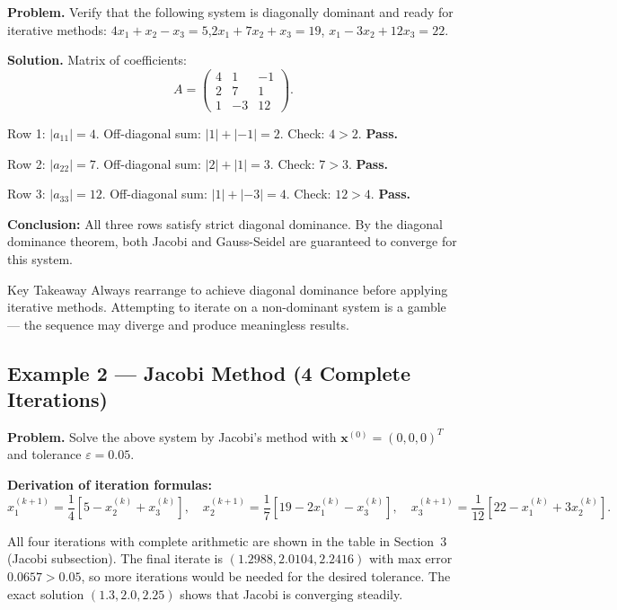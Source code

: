 \documentclass[12pt,a4paper]{article}
\begin{document}
\textbf{Problem.} Verify that the following system is diagonally dominant and ready
for iterative methods: \(4x_1+x_2-x_3=5\),\quad \(2x_1+7x_2+x_3=19\),\quad
\(x_1-3x_2+12x_3=22\).

\textbf{Solution.}
Matrix of coefficients:
\[
A = \begin{pmatrix} 4 & 1 & -1 \\ 2 & 7 & 1 \\ 1 & -3 & 12 \end{pmatrix}.
\]

Row 1: \(|a_{11}| = 4\). Off-diagonal sum: \(|1| + |-1| = 2\). Check: \(4 > 2\). \textbf{Pass.}

Row 2: \(|a_{22}| = 7\). Off-diagonal sum: \(|2| + |1| = 3\). Check: \(7 > 3\). \textbf{Pass.}

Row 3: \(|a_{33}| = 12\). Off-diagonal sum: \(|1| + |-3| = 4\). Check: \(12 > 4\). \textbf{Pass.}

\textbf{Conclusion:} All three rows satisfy strict diagonal dominance. By the diagonal
dominance theorem, both Jacobi and Gauss-Seidel are guaranteed to converge for this system.

\begin{learnbox}{Key Takeaway}
Always rearrange to achieve diagonal dominance before applying iterative methods.
Attempting to iterate on a non-dominant system is a gamble --- the sequence may diverge
and produce meaningless results.
\end{learnbox}

\subsection*{Example 2 --- Jacobi Method (4 Complete Iterations)}

\textbf{Problem.} Solve the above system by Jacobi's method with
\(\mathbf{x}^{(0)}=(0,0,0)^T\) and tolerance \(\varepsilon=0.05\).

\textbf{Derivation of iteration formulas:}
\[
x_1^{(k+1)} = \frac{1}{4}\!\left[5 - x_2^{(k)} + x_3^{(k)}\right], \quad
x_2^{(k+1)} = \frac{1}{7}\!\left[19 - 2x_1^{(k)} - x_3^{(k)}\right], \quad
x_3^{(k+1)} = \frac{1}{12}\!\left[22 - x_1^{(k)} + 3x_2^{(k)}\right].
\]

All four iterations with complete arithmetic are shown in the table in Section~3 (Jacobi subsection).
The final iterate is \((1.2988, 2.0104, 2.2416)\) with max error \(0.0657 > 0.05\), so
more iterations would be needed for the desired tolerance. The exact solution
\((1.3, 2.0, 2.25)\) shows that Jacobi is converging steadily.
\end{document}
